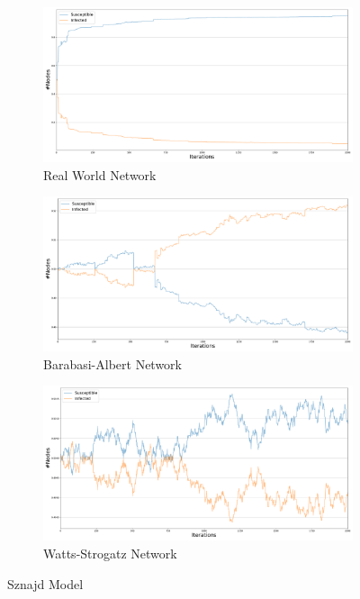 \documentclass[sigchi]{acmart}
\begin{document}
\begin{figure}[h]
\centering
\begin{subfigure}[h]{1\columnwidth}
    \centering
   \includegraphics[width=.8\linewidth]{report/img/OD/Sznajd_0.5.pdf}
   \caption{Real World Network}
   \label{fig:RW_Szn} 
\end{subfigure}

\begin{subfigure}[h]{1\columnwidth}
   \centering
   \includegraphics[width=.8\linewidth]{report/img/OD/SznajdBA_0.5.pdf}
   \caption{Barabasi-Albert Network}
   \label{fig:BA_Szn}
\end{subfigure}

\begin{subfigure}[h]{1\columnwidth}
   \centering
   \includegraphics[width=.8\linewidth]{report/img/OD/SznajdWS_0.5.pdf}
   \caption{Watts-Strogatz Network}
   \label{fig:WS_Szn}
\end{subfigure}
\caption{Sznajd Model}
\label{fig:Sznajd}
\end{figure}
\end{document}
